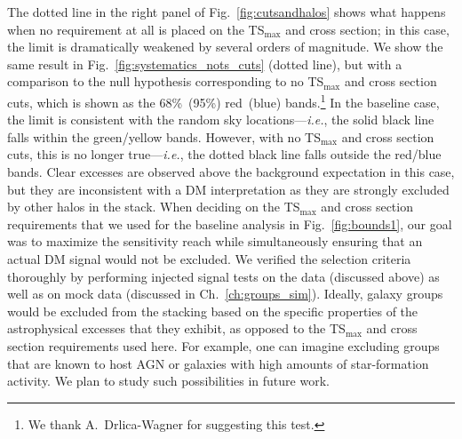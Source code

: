 The dotted line in the right panel of Fig.~\ref{fig:cutsandhalos} shows  what happens when no requirement at all is placed on the TS$_\text{max}$ and cross section; in this case, the limit is dramatically weakened by several orders of magnitude.   We show the same result in Fig.~\ref{fig:systematics_nots_cuts} (dotted line), but with a comparison to the null hypothesis corresponding to no TS$_\text{max}$ and cross section cuts, which is shown as the 68\%~(95\%) red~(blue) bands.\footnote{We thank A.~Drlica-Wagner for suggesting this test.}    In the baseline case, the limit is consistent with the random sky locations---\emph{i.e.}, the solid black line falls within the green/yellow bands.  However, with no TS$_\text{max}$ and cross section cuts, this is no longer true---\emph{i.e.}, the dotted black line falls outside the red/blue bands.  Clear excesses are observed above the background expectation in this case, but they are inconsistent with a DM interpretation as they are strongly excluded by other halos in the stack.  When deciding on the TS$_\text{max}$ and cross section requirements that we used for the baseline analysis in Fig.~\ref{fig:bounds1}, our goal was to maximize the sensitivity reach while simultaneously ensuring that an actual DM signal would not be excluded.  We verified the selection criteria thoroughly by performing injected signal tests on the data (discussed above) as well as on mock data (discussed in Ch.~\ref{ch:groups_sim}).  Ideally, galaxy groups would be excluded from the stacking based on the specific properties of the astrophysical excesses that they exhibit, as opposed to the TS$_\text{max}$ and cross section requirements used here.  For example, one can imagine excluding groups that are known to host  AGN or galaxies with high amounts of star-formation activity.  We plan to study such possibilities in future work.        \vspace{0.1in}

